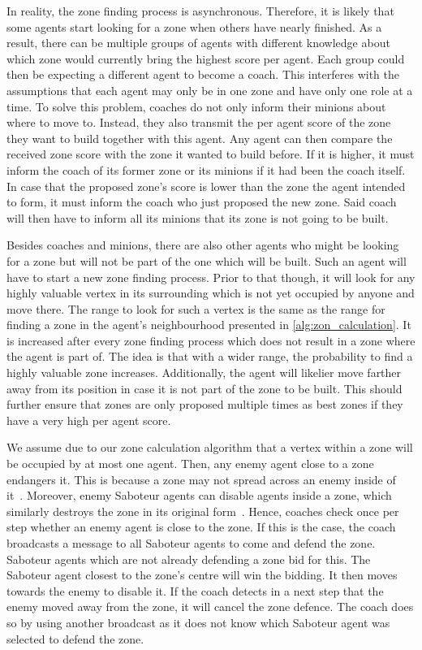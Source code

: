 In reality, the zone finding process is asynchronous.
Therefore, it is likely that some agents start looking for a zone when others have nearly finished.
As a result, there can be multiple groups of agents with different knowledge about which zone would currently bring the highest score per agent.
Each group could then be expecting a different agent to become a coach.
This interferes with the assumptions that each agent may only be in one zone and have only one role at a time.
To solve this problem, coaches do not only inform their minions about where to move to.
Instead, they also transmit the per agent score of the zone they want to build together with this agent.
Any agent can then compare the received zone score with the zone it wanted to build before.
If it is higher, it must inform the coach of its former zone or its minions if it had been the coach itself.
In case that the proposed zone's score is lower than the zone the agent intended to form, it must inform the coach who just proposed the new zone.
Said coach will then have to inform all its minions that its zone is not going to be built.

Besides coaches and minions, there are also other agents who might be looking for a zone but will not be part of the one which will be built.
Such an agent will have to start a new zone finding process.
Prior to that though, it will look for any highly valuable vertex in its surrounding which is not yet occupied by anyone and move there.
The range to look for such a vertex is the same as the range for finding a zone in the agent's neighbourhood presented in \autoref{alg:zon_calculation}.
It is increased after every zone finding process which does not result in a zone where the agent is part of.
The idea is that with a wider range, the probability to find a highly valuable zone increases.
Additionally, the agent will likelier move farther away from its position in case it is not part of the zone to be built.
This should further ensure that zones are only proposed multiple times as best zones if they have a very high per agent score.

We assume due to our zone calculation algorithm that a vertex within a zone will be occupied by at most one agent.
Then, any enemy agent close to a zone endangers it.
This is because a zone may not spread across an enemy inside of it~\cite{ahlbrecht_mapc_2014}.  %
Moreover, enemy Saboteur agents can disable agents inside a zone, which similarly destroys the zone in its original form~\cite{ahlbrecht_mapc_2014}.  %
Hence, coaches check once per step whether an enemy agent is close to the zone.
If this is the case, the coach broadcasts a message to all Saboteur agents to come and defend the zone.
Saboteur agents which are not already defending a zone bid for this.
The Saboteur agent closest to the zone's centre will win the bidding.
It then moves towards the enemy to disable it.
If the coach detects in a next step that the enemy moved away from the zone, it will cancel the zone defence.
The coach does so by using another broadcast as it does not know which Saboteur agent was selected to defend the zone.

